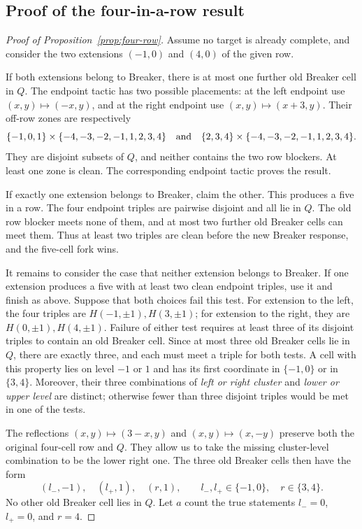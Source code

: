 \subsection{Proof of the four-in-a-row result}

\begin{proof}[Proof of Proposition~\ref{prop:four-row}]
Assume no target is already complete, and consider the two
extensions $(-1,0)$ and $(4,0)$ of the given row.

If both extensions belong to Breaker, there is at most one further
old Breaker cell in $Q$. The endpoint tactic has two possible
placements: at the left endpoint use $(x,y)\mapsto(-x,y)$, and
at the right endpoint use $(x,y)\mapsto(x+3,y)$.
Their off-row zones are respectively
\[
 \{-1,0,1\}\times\{-4,-3,-2,-1,1,2,3,4\}
 \quad\hbox{and}\quad
 \{2,3,4\}\times\{-4,-3,-2,-1,1,2,3,4\}.
\]
They are disjoint subsets of $Q$, and neither contains the two
row blockers. At least one zone is clean. The corresponding
endpoint tactic proves the result.

If exactly one extension belongs to Breaker, claim the other.
This produces a five in a row. The four endpoint triples are
pairwise disjoint and all lie in $Q$. The old row blocker meets
none of them, and at most two further old Breaker cells can meet
them. Thus at least two triples are clean before the new Breaker
response, and the five-cell fork wins.

It remains to consider the case that neither extension belongs
to Breaker. If one extension produces a five with at least two
clean endpoint triples, use it and finish as above. Suppose that
both choices fail this test. For extension to the left, the four
triples are $H(-1,\pm1),H(3,\pm1)$; for extension to the right,
they are $H(0,\pm1),H(4,\pm1)$.
Failure of either test requires at least three of its disjoint
triples to contain an old Breaker cell. Since at most three old
Breaker cells lie in $Q$, there are exactly three, and each must
meet a triple for both tests. A cell with this property lies on
level $-1$ or $1$ and has its first coordinate in $\{-1,0\}$
or in $\{3,4\}$. Moreover, their three combinations of
\emph{left or right cluster} and \emph{lower or upper level}
are distinct; otherwise fewer than three disjoint triples would
be met in one of the tests.

The reflections $(x,y)\mapsto(3-x,y)$ and
$(x,y)\mapsto(x,-y)$ preserve both the original four-cell row
and $Q$. They allow us to take the missing cluster-level
combination to be the lower right one. The three old Breaker
cells then have the form
\begin{equation}\label{eq:three-blockers}
 (l_-,-1),\quad(l_+,1),\quad(r,1),
 \qquad l_-,l_+\in\{-1,0\},\quad r\in\{3,4\}.
\end{equation}
No other old Breaker cell lies in $Q$.
Let $a$ count the true statements $l_-=0$, $l_+=0$, and $r=4$.


\end{proof}
